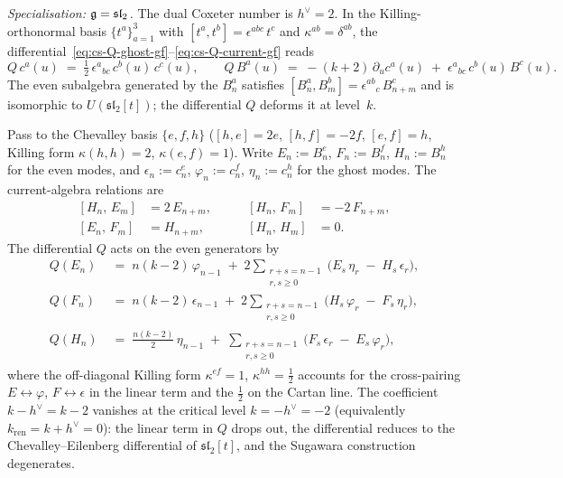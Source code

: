 \smallskip
\noindent
\emph{Specialisation: $\mathfrak{g} = \mathfrak{sl}_2$.}
The dual Coxeter number is $h^\vee = 2$.
In the Killing-orthonormal basis $\{t^a\}_{a=1}^3$
with $[t^a, t^b] = \epsilon^{abc}\, t^c$ and
$\kappa^{ab} = \delta^{ab}$,
the differential~\eqref{eq:cs-Q-ghost-gf}--\eqref{eq:cs-Q-current-gf}
reads
\begin{equation}\label{eq:sl2-Q-orthonormal}
Q\, c^a(u)
\;=\;
\tfrac{1}{2}\,\epsilon^{a}{}_{bc}\, c^b(u)\, c^c(u),
\qquad
Q\, B^a(u)
\;=\;
-(k + 2)\,\partial_u c^a(u)
\;+\;
\epsilon^{a}{}_{bc}\, c^b(u)\, B^c(u).
\end{equation}
The even subalgebra generated by the $B^a_n$
satisfies $[B^a_n, B^b_m] = \epsilon^{ab}{}_{c}\, B^c_{n+m}$
and is isomorphic to $U(\mathfrak{sl}_2[t])$;
the differential $Q$ deforms it at level~$k$.

Pass to the Chevalley basis $\{e, f, h\}$
($[h,e] = 2e$, $[h,f] = -2f$, $[e,f] = h$,
Killing form $\kappa(h,h) = 2$,
$\kappa(e,f) = 1$).
Write $E_n := B_n^e$, $F_n := B_n^f$,
$H_n := B_n^h$ for the even modes, and
$\epsilon_n := c_n^e$, $\varphi_n := c_n^f$,
$\eta_n := c_n^h$ for the ghost modes.
The current-algebra relations are
\begin{equation}\label{eq:sl2-yangian-modes}
\begin{aligned}
{[H_n,\, E_m]} &= 2\, E_{n+m},
&\qquad
{[H_n,\, F_m]} &= -2\, F_{n+m},
\\[3pt]
{[E_n,\, F_m]} &= H_{n+m},
&\qquad
{[H_n,\, H_m]} &= 0.
\end{aligned}
\end{equation}
The differential $Q$ acts on the even
generators by
\begin{equation}\label{eq:sl2-Q-EFH}
\begin{aligned}
Q(E_n)
&\;=\;
n(k-2)\,\varphi_{n-1}
\;+\;
2\!\!\sum_{\substack{r+s=n-1\\r,s\ge 0}}
\bigl(
 E_s\, \eta_r
 \;-\;
 H_s\, \epsilon_r
\bigr),
\\[4pt]
Q(F_n)
&\;=\;
n(k-2)\,\epsilon_{n-1}
\;+\;
2\!\!\sum_{\substack{r+s=n-1\\r,s\ge 0}}
\bigl(
 H_s\, \varphi_r
 \;-\;
 F_s\, \eta_r
\bigr),
\\[4pt]
Q(H_n)
&\;=\;
\tfrac{n(k-2)}{2}\,\eta_{n-1}
\;+\;
\sum_{\substack{r+s=n-1\\r,s\ge 0}}
\bigl(
 F_s\, \epsilon_r
 \;-\;
 E_s\, \varphi_r
\bigr),
\end{aligned}
\end{equation}
where the off-diagonal Killing form
$\kappa^{ef} = 1$, $\kappa^{hh} = \tfrac{1}{2}$
accounts for the cross-pairing $E \leftrightarrow
\varphi$, $F \leftrightarrow \epsilon$ in the
linear term and the $\tfrac{1}{2}$ on the
Cartan line.
The coefficient $k - h^\vee = k - 2$ vanishes at the
critical level $k = -h^\vee = -2$ (equivalently
$k_{\mathrm{ren}} = k + h^\vee = 0$):
the linear term in $Q$ drops out, the differential reduces
to the Chevalley--Eilenberg differential of
$\mathfrak{sl}_2[t]$, and the Sugawara construction
degenerates.

